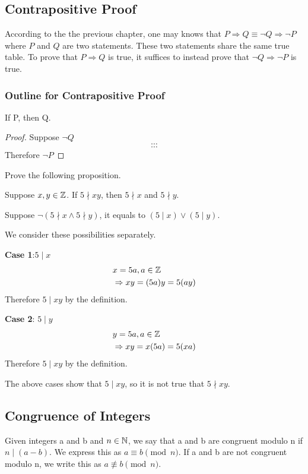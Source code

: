 \subsection{Contrapositive Proof}
According to the the previous chapter, one may knows that $P \Rightarrow Q \equiv \neg Q \Rightarrow \neg P$ where $P$ and $Q$ are two statements. 
These two statements share the same true table. To prove that $P \Rightarrow Q$ is true, it suffices to instead prove that $\neg Q \Rightarrow \neg P$ is true. 

\subsubsection{Outline for Contrapositive Proof}
\begin{proposition}
    If P, then Q.
    \begin{proof}
        Suppose $\neg Q$
        $$\cdots$$
        $$\cdots$$
        Therefore $\neg P$
    \end{proof}
\end{proposition}

\begin{example}
    Prove the following proposition.
    \begin{proposition}
        Suppose $x, y \in \mathbb{Z}$. If $5 \nmid xy$, then $5 \nmid x$ and $5 \nmid y$.
    \end{proposition}
    Suppose $\neg \left(5 \nmid x \wedge 5 \nmid y\right)$, it equals to $(5 \mid x) \vee (5 \mid y)$. 
    
    We consider these possibilities separately.
    
    \textbf{Case 1}:$5 \mid x$
    \begin{align*}
        &x = 5a, a \in \mathbb{Z} \\
        &\Rightarrow xy = (5a)y = 5(ay)
    \end{align*}
    Therefore $5 \mid xy$ by the definition.
    
    \textbf{Case 2}: $5 \mid y$
    \begin{align*}
        &y = 5a, a \in \mathbb{Z} \\
        &\Rightarrow xy = x(5a) = 5(xa)
    \end{align*}
    Therefore $5 \mid xy$ by the definition.

    The above cases show that $5 \mid xy$, so it is not true that $5 \nmid xy$.
\end{example}

\subsection{Congruence of Integers}
\begin{definition}
    Given integers a and b and $n \in \mathbb{N}$, we say that a and b are congruent modulo n if $n \mid (a - b)$. We express this as $a \equiv b \pmod{n}$. 
    If a and b are not congruent modulo n, we write this as $a \not\equiv b \pmod{n}$.
\end{definition}

